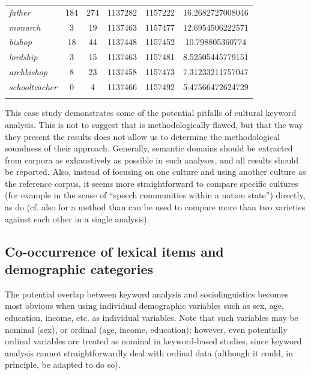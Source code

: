 \begin{table}
{\begin{tabular}[t]{l *{2}{S[table-format=4]} *{2}{S[table-format=8]} S}
\textit{father} & 184 & 274 & 1137282 & 1157222 & 16.2682727008046 \\
\textit{monarch} & 3 & 19 & 1137463 & 1157477 & 12.6954506222571 \\
\textit{bishop} & 18 & 44 & 1137448 & 1157452 & 10.798805360774 \\
\textit{lordship} & 3 & 15 & 1137463 & 1157481 & 8.52505445779151 \\
\textit{archbishop} & 8 & 23 & 1137458 & 1157473 & 7.31233211757047 \\
\textit{schoolteacher} & 0 & 4 & 1137466 & 1157492 & 5.47566472624729 \\
\lspbottomrule
\end{tabular}}
\end{table}

This case study demonstrates some of the potential pitfalls of cultural  keyword  analysis. This is not to suggest that \citet{wolf_fixed_2007} is methodologically flawed, but that the way they present the results does not allow us to determine the methodological soundness of their approach. Generally, semantic  domains should be extracted  from corpora as exhaustively as possible in such analyses, and all results should be reported. Also, instead of focusing on one culture  and using another culture as the reference corpus, it seems more straightforward to compare specific cultures  (for example in the sense of ``speech communities within a nation state'') directly, as \citet{leech_computer_1992} do (cf. also \citealt{oakes_use_2007} for a method than can be used to compare more than two varieties  against each other in a single analysis).

\subsection{Co\hyp{}occurrence of lexical items and demographic categories}
\label{sec:co-occurrenceoflexicalitemsanddemographiccategories}

The potential overlap between keyword  analysis and sociolinguistics  becomes most obvious when using individual demographic  variables such as sex, age,  education, income, etc. as individual variables. Note that such variables may be nominal  (sex), or ordinal (age,  income, education); however, even potentially ordinal  variables are treated as nominal in keyword\hyp{}based  studies, since keyword analysis cannot straightforwardly deal with ordinal data (although it could, in principle, be adapted to do so).

